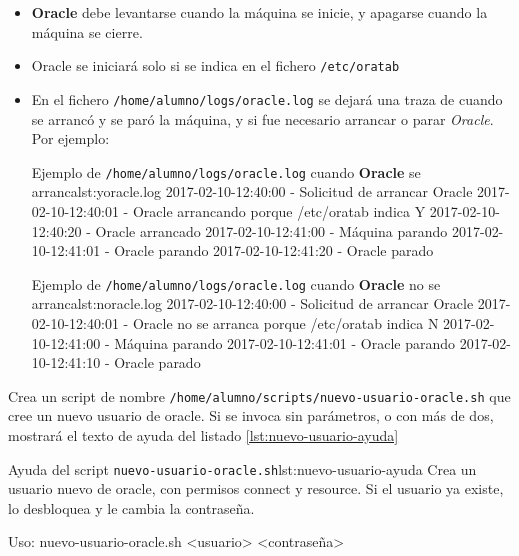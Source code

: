 \begin{homeworkProblem}

  \begin{itemize}
  \item \textbf{Oracle} debe levantarse cuando la máquina se inicie, y apagarse cuando la máquina se cierre.
  \item Oracle se iniciará solo si se indica en el fichero \texttt{/etc/oratab}
  
  \item En el fichero \texttt{/home/alumno/logs/oracle.log} se dejará una traza de cuando se arrancó y se paró la máquina, y si fue necesario arrancar o parar \textit{Oracle}. Por ejemplo:
    
    \begin{listadotxt}{Ejemplo de \texttt{/home/alumno/logs/oracle.log} cuando \textbf{Oracle} se arranca}{lst:yoracle.log}
      2017-02-10-12:40:00 - Solicitud de arrancar Oracle
      2017-02-10-12:40:01 - Oracle arrancando porque /etc/oratab indica Y
      2017-02-10-12:40:20 - Oracle arrancado
      2017-02-10-12:41:00 - Máquina parando
      2017-02-10-12:41:01 - Oracle parando
      2017-02-10-12:41:20 - Oracle parado
    \end{listadotxt}

    \begin{listadotxt}{Ejemplo de \texttt{/home/alumno/logs/oracle.log} cuando \textbf{Oracle} no se arranca}{lst:noracle.log}
      2017-02-10-12:40:00 - Solicitud de arrancar Oracle
      2017-02-10-12:40:01 - Oracle no se arranca porque /etc/oratab indica N
      2017-02-10-12:41:00 - Máquina parando
      2017-02-10-12:41:01 - Oracle parando
      2017-02-10-12:41:10 - Oracle parado
    \end{listadotxt}

    
  \end{itemize}
  
\end{homeworkProblem}

\begin{homeworkProblem}
  Crea un script de nombre \texttt{/home/alumno/scripts/nuevo-usuario-oracle.sh} que cree un nuevo usuario de oracle. Si se invoca sin parámetros, o con más de dos, mostrará el texto de ayuda del listado \ref{lst:nuevo-usuario-ayuda}

  \begin{listadotxt}{Ayuda del script \texttt{nuevo-usuario-oracle.sh}}{lst:nuevo-usuario-ayuda}
  Crea un usuario nuevo de oracle, con permisos connect y resource.
  Si el usuario ya existe, lo desbloquea y le cambia la contraseña.
  
  Uso: nuevo-usuario-oracle.sh <usuario> <contraseña>
  \end{listadotxt}
\end{homeworkProblem}


